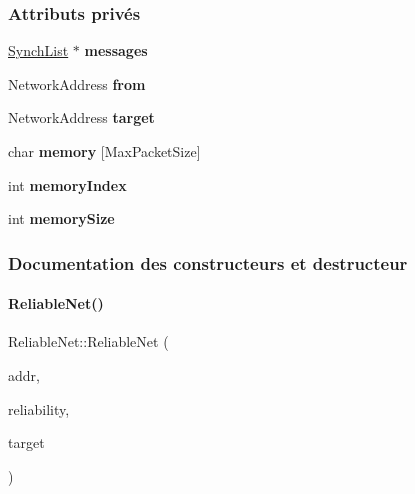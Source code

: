 \subsubsection*{Attributs privés}
\begin{DoxyCompactItemize}
\item 
\hypertarget{class_reliable_net_af7880c4044b0b3c900ee88f1ac315b80}{}\label{class_reliable_net_af7880c4044b0b3c900ee88f1ac315b80} 
\hyperlink{class_synch_list}{Synch\+List} $\ast$ {\bfseries messages}
\item 
\hypertarget{class_reliable_net_a23eed2081e68d3c79037a896850f9da0}{}\label{class_reliable_net_a23eed2081e68d3c79037a896850f9da0} 
Network\+Address {\bfseries from}
\item 
\hypertarget{class_reliable_net_a9bde09c291351d5b388849789363a790}{}\label{class_reliable_net_a9bde09c291351d5b388849789363a790} 
Network\+Address {\bfseries target}
\item 
\hypertarget{class_reliable_net_ae1749bc67d697d651379b2b99bb48d43}{}\label{class_reliable_net_ae1749bc67d697d651379b2b99bb48d43} 
char {\bfseries memory} \mbox{[}Max\+Packet\+Size\mbox{]}
\item 
\hypertarget{class_reliable_net_a41e596eebb89f92b8af39b4fb3348489}{}\label{class_reliable_net_a41e596eebb89f92b8af39b4fb3348489} 
int {\bfseries memory\+Index}
\item 
\hypertarget{class_reliable_net_a37679798df9712548ef211b36959810b}{}\label{class_reliable_net_a37679798df9712548ef211b36959810b} 
int {\bfseries memory\+Size}
\end{DoxyCompactItemize}


\subsubsection{Documentation des constructeurs et destructeur}
\hypertarget{class_reliable_net_ab4a1b19edd7bb7f0704c8dafc1aa7bd5}{}\label{class_reliable_net_ab4a1b19edd7bb7f0704c8dafc1aa7bd5} 
\paragraph{\texorpdfstring{Reliable\+Net()}{ReliableNet()}}
{\footnotesize\ttfamily Reliable\+Net\+::\+Reliable\+Net (\begin{DoxyParamCaption}\item[{Network\+Address}]{addr,  }\item[{double}]{reliability,  }\item[{Network\+Address}]{target }\end{DoxyParamCaption})}



